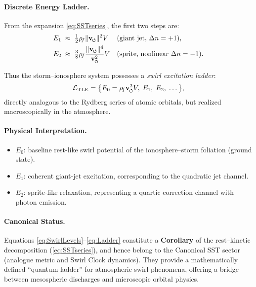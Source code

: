 \documentclass[reprint,aps,onecolumn,nofootinbib]{revtex4-2}
\newcommand{\swirlarrow}{%
    \mathchoice{\mkern-2mu\scriptstyle\boldsymbol{\circlearrowleft}}%
    {\mkern-2mu\scriptstyle\boldsymbol{\circlearrowleft}}%
    {\mkern-2mu\scriptscriptstyle\boldsymbol{\circlearrowleft}}%
    {\mkern-2mu\scriptscriptstyle\boldsymbol{\circlearrowleft}}%
}
\newcommand{\vswirl}{\mathbf{v}_{\swirlarrow}}
\newcommand{\vnorm}{\lVert \vswirl \rVert}               %
\newcommand{\rhof}{\rho_{\!f}}                           %
\newcommand{\Ce}{\vswirl}
\begin{document}
    \paragraph{Discrete Energy Ladder.}
        From the expansion \eqref{eq:SSTseries}, the first two steps are:
        \begin{align}
        E_1 &\;\approx\; \tfrac{1}{2}\rhof \vnorm^2 V
        && \text{(giant jet, $\Delta n = +1$)} ,
        \label{eq:E1}\\
        E_2 &\;\approx\; \tfrac{3}{8}\rhof \frac{\vnorm^4}{\Ce^2} V
        && \text{(sprite, nonlinear $\Delta n = -1$)} .
        \label{eq:E2}
        \end{align}

        Thus the storm--ionosphere system possesses
        a \emph{swirl excitation ladder}:
        \begin{equation}
        \mathcal{L}_{\text{TLE}} =
        \bigl\{ E_0 = \rhof \Ce^2 V, \;
        E_1, \; E_2, \; \dots \bigr\},
        \label{eq:Ladder}
        \end{equation}
        directly analogous to the Rydberg series of atomic orbitals,
        but realized macroscopically in the atmosphere.

    \paragraph{Physical Interpretation.}
        \begin{itemize}
        \item $E_0$: baseline rest-like swirl potential of the
        ionosphere--storm foliation (ground state).
        \item $E_1$: coherent giant-jet excitation,
        corresponding to the quadratic jet channel.
        \item $E_2$: sprite-like relaxation,
        representing a quartic correction channel with photon emission.
        \end{itemize}

    \paragraph{Canonical Status.}
        Equations \eqref{eq:SwirlLevels}--\eqref{eq:Ladder}
        constitute a \textbf{Corollary} of the
        rest--kinetic decomposition (\eqref{eq:SSTseries}),
        and hence belong to the Canonical SST sector
        (analogue metric and Swirl Clock dynamics).
        They provide a mathematically defined ``quantum ladder''
        for atmospheric swirl phenomena, offering a bridge between
        mesospheric discharges and microscopic orbital physics.
\end{document}
